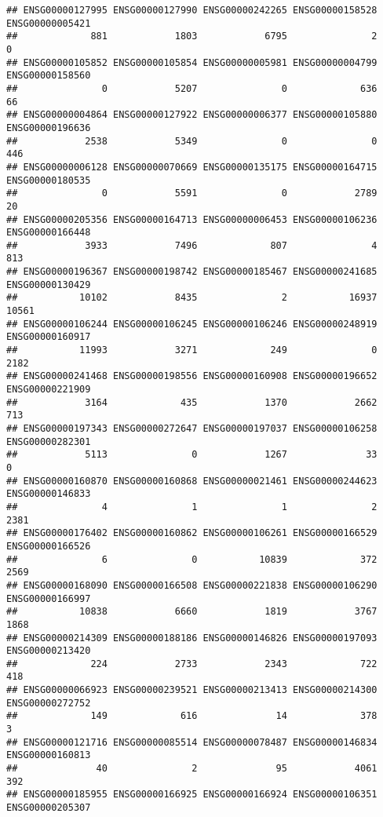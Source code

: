 \documentclass[
]{article}
\begin{document}
\begin{verbatim}
## ENSG00000127995 ENSG00000127990 ENSG00000242265 ENSG00000158528 ENSG00000005421 
##             881            1803            6795               2               0 
## ENSG00000105852 ENSG00000105854 ENSG00000005981 ENSG00000004799 ENSG00000158560 
##               0            5207               0             636              66 
## ENSG00000004864 ENSG00000127922 ENSG00000006377 ENSG00000105880 ENSG00000196636 
##            2538            5349               0               0             446 
## ENSG00000006128 ENSG00000070669 ENSG00000135175 ENSG00000164715 ENSG00000180535 
##               0            5591               0            2789              20 
## ENSG00000205356 ENSG00000164713 ENSG00000006453 ENSG00000106236 ENSG00000166448 
##            3933            7496             807               4             813 
## ENSG00000196367 ENSG00000198742 ENSG00000185467 ENSG00000241685 ENSG00000130429 
##           10102            8435               2           16937           10561 
## ENSG00000106244 ENSG00000106245 ENSG00000106246 ENSG00000248919 ENSG00000160917 
##           11993            3271             249               0            2182 
## ENSG00000241468 ENSG00000198556 ENSG00000160908 ENSG00000196652 ENSG00000221909 
##            3164             435            1370            2662             713 
## ENSG00000197343 ENSG00000272647 ENSG00000197037 ENSG00000106258 ENSG00000282301 
##            5113               0            1267              33               0 
## ENSG00000160870 ENSG00000160868 ENSG00000021461 ENSG00000244623 ENSG00000146833 
##               4               1               1               2            2381 
## ENSG00000176402 ENSG00000160862 ENSG00000106261 ENSG00000166529 ENSG00000166526 
##               6               0           10839             372            2569 
## ENSG00000168090 ENSG00000166508 ENSG00000221838 ENSG00000106290 ENSG00000166997 
##           10838            6660            1819            3767            1868 
## ENSG00000214309 ENSG00000188186 ENSG00000146826 ENSG00000197093 ENSG00000213420 
##             224            2733            2343             722             418 
## ENSG00000066923 ENSG00000239521 ENSG00000213413 ENSG00000214300 ENSG00000272752 
##             149             616              14             378               3 
## ENSG00000121716 ENSG00000085514 ENSG00000078487 ENSG00000146834 ENSG00000160813 
##              40               2              95            4061             392 
## ENSG00000185955 ENSG00000166925 ENSG00000166924 ENSG00000106351 ENSG00000205307 

\end{verbatim}
\end{document}

